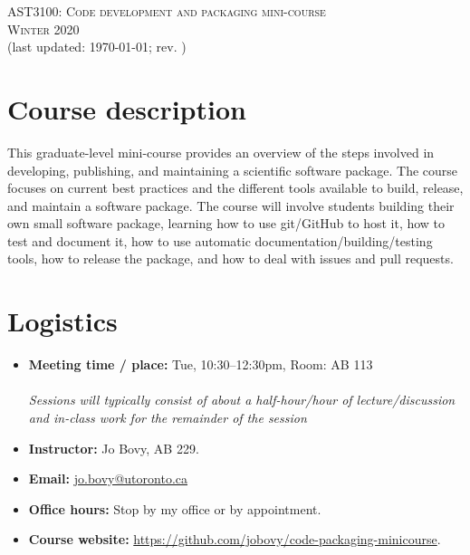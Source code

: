 \documentclass{article}
\begin{document}
\begin{center}
  \LARGE{\scshape{AST3100: Code development and packaging mini-course}}\\[5pt]
  \Large{\scshape{Winter 2020}}\\[5pt]
  \large{(last updated: \today; rev. \githash)}\\[25pt]
\end{center}

\section*{Course description}

This graduate-level mini-course provides an overview of the steps
involved in developing, publishing, and maintaining a scientific
software package. The course focuses on current best practices and the
different tools available to build, release, and maintain a software
package. The course will involve students building their own small
software package, learning how to use git/GitHub to host it, how to
test and document it, how to use automatic
documentation/building/testing tools, how to release the package, and
how to deal with issues and pull requests.

\section*{Logistics}

\begin{itemize}

  \item {\bf Meeting time / place:} Tue, 10:30--12:30pm, Room: AB
    113\\\\\emph{Sessions will typically consist of about a
      half-hour/hour of lecture/discussion and in-class work for the
      remainder of the session}

  \item {\bf Instructor:} Jo Bovy, AB 229.

  \item {\bf Email:} \href{mailto:jo.bovy@utoronto.ca}{jo.bovy@utoronto.ca}

  \item {\bf Office hours:} Stop by my office or by appointment.

  \item {\bf Course website:} \url{https://github.com/jobovy/code-packaging-minicourse}.

\end{itemize}
\end{document}
